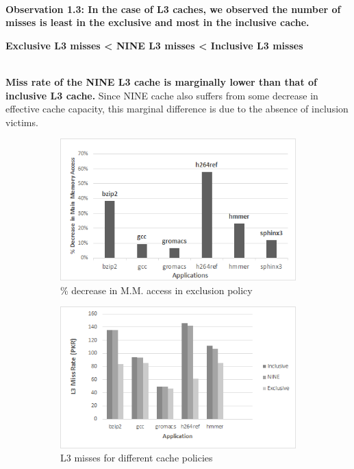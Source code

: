 \documentclass[]{article}
\begin{document}
\\
\textbf{Observation 1.3: 
In the case of L3 caches, we observed the number of misses is least in the exclusive and most in the inclusive cache.} 
\begin{center}
    \textbf{Exclusive L3 misses < NINE L3 misses < Inclusive L3 misses}\\ 
\end{center}
\\
\textbf{Miss rate of the NINE L3 cache is marginally lower than that of inclusive L3 cache.} Since NINE cache also suffers from some decrease in effective cache capacity, this marginal difference is due to the absence of inclusion victims. 
\\
\begin{figure}[!h] 
    \centering
	\begin{subfigure}[b]{7cm} 
		\centering 
		\includegraphics[scale=0.8]{Decrease-memory-access.png}
		\caption{\% decrease in M.M. access in exclusion policy} 
	\end{subfigure} 
	\hspace{0cm} 
	\begin{subfigure}[b]{8cm} 
		\centering 
		\includegraphics[scale=0.8]{L3_MissRate.png}
		\caption{L3 misses for different cache policies} 
	\end{subfigure}
	
	\caption{}
\end{figure}\\
\end{document}
